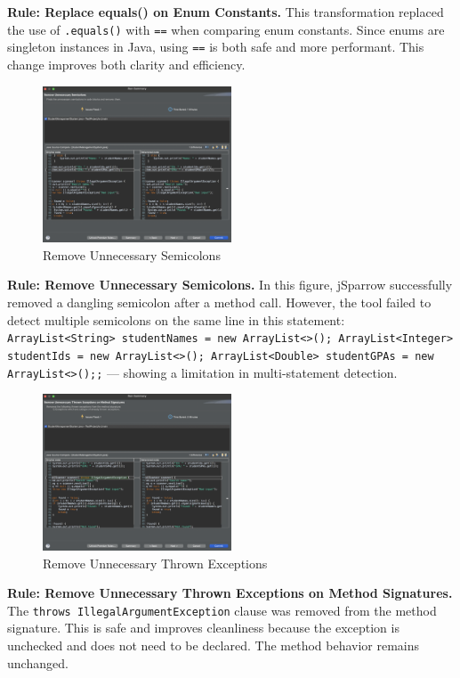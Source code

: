 \documentclass[a4paper,12pt]{article}
\begin{document}
\textbf{Rule: Replace equals() on Enum Constants.} This transformation replaced the use of \texttt{.equals()} with \texttt{==} when comparing enum constants. Since enums are singleton instances in Java, using \texttt{==} is both safe and more performant. This change improves both clarity and efficiency.

\begin{figure}[H]
  \centering
  \includegraphics[width=0.5\textwidth]{issue-4.png}
  \caption{Remove Unnecessary Semicolons}
  \label{fig:issue-4}
\end{figure}

\textbf{Rule: Remove Unnecessary Semicolons.} In this figure, jSparrow successfully removed a dangling semicolon after a method call. However, the tool failed to detect multiple semicolons on the same line in this statement:
\texttt{ArrayList<String> studentNames = new ArrayList<>(); ArrayList<Integer> studentIds = new ArrayList<>(); ArrayList<Double> studentGPAs = new ArrayList<>();;} — showing a limitation in multi-statement detection.

\begin{figure}[H]
  \centering
  \includegraphics[width=0.5\textwidth]{issue-5.png}
  \caption{Remove Unnecessary Thrown Exceptions}
  \label{fig:issue-5}
\end{figure}

\textbf{Rule: Remove Unnecessary Thrown Exceptions on Method Signatures.} The \texttt{throws IllegalArgumentException} clause was removed from the method signature. This is safe and improves cleanliness because the exception is unchecked and does not need to be declared. The method behavior remains unchanged.
\end{document}
